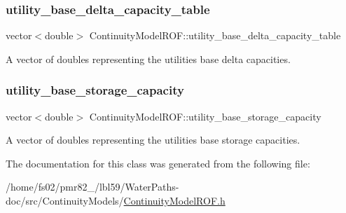 \subsubsection{\texorpdfstring{utility\+\_\+base\+\_\+delta\+\_\+capacity\+\_\+table}{utility\_base\_delta\_capacity\_table}}
{\footnotesize\ttfamily vector$<$double$>$ Continuity\+Model\+R\+O\+F\+::utility\+\_\+base\+\_\+delta\+\_\+capacity\+\_\+table\hspace{0.3cm}{\ttfamily [protected]}}



A vector of doubles representing the utilities\textquotesingle{} base delta capacities. 

\mbox{\label{classContinuityModelROF_a6a429c37f019777325ea4e5b9ad26cae}} 
\subsubsection{\texorpdfstring{utility\+\_\+base\+\_\+storage\+\_\+capacity}{utility\_base\_storage\_capacity}}
{\footnotesize\ttfamily vector$<$double$>$ Continuity\+Model\+R\+O\+F\+::utility\+\_\+base\+\_\+storage\+\_\+capacity\hspace{0.3cm}{\ttfamily [protected]}}



A vector of doubles representing the utilities\textquotesingle{} base storage capacities. 



The documentation for this class was generated from the following file\+:\begin{DoxyCompactItemize}
\item 
/home/fs02/pmr82\+\_/lbl59/\+Water\+Paths-\/doc/src/\+Continuity\+Models/\mbox{\hyperlink{ContinuityModelROF_8h}{Continuity\+Model\+R\+O\+F.\+h}}\end{DoxyCompactItemize}
